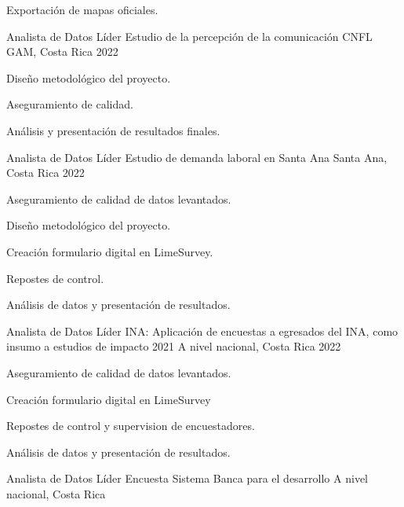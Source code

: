 \begin{cventries}
{\begin{cvitems}
    \item Exportación de mapas oficiales.
  \end{cvitems}
}
\cventry
{Analista de Datos Líder} %
{Estudio de la percepción de la comunicación CNFL} %
{GAM, Costa Rica} %
{2022} %
{
  \begin{cvitems} %
    \item Diseño metodológico del proyecto.
    \item Aseguramiento de calidad.
    \item Análisis y presentación de resultados finales.
  \end{cvitems}
}
\cventry
{Analista de Datos Líder} %
{Estudio de demanda laboral en Santa Ana} %
{Santa Ana, Costa Rica} %
{2022} %
{
  \begin{cvitems} %
    \item Aseguramiento de calidad de datos levantados.
    \item Diseño metodológico del proyecto.
    \item Creación formulario digital en LimeSurvey.
    \item Repostes de control.
    \item Análisis de datos y presentación de resultados.
  \end{cvitems}
}
\cventry
{Analista de Datos Líder} %
{INA: Aplicación de encuestas a egresados del INA, como insumo a estudios de impacto 2021} %
{A nivel nacional, Costa Rica} %
{2022} %
{
  \begin{cvitems} %
    \item Aseguramiento de calidad de datos levantados.
    \item Creación formulario digital en LimeSurvey
    \item Repostes de control y supervision de encuestadores.
    \item Análisis de datos y presentación de resultados.
  \end{cvitems}
}
\cventry
{Analista de Datos Líder} %
{Encuesta Sistema Banca para el desarrollo} %
{A nivel nacional, Costa Rica} %

\end{cventries}
